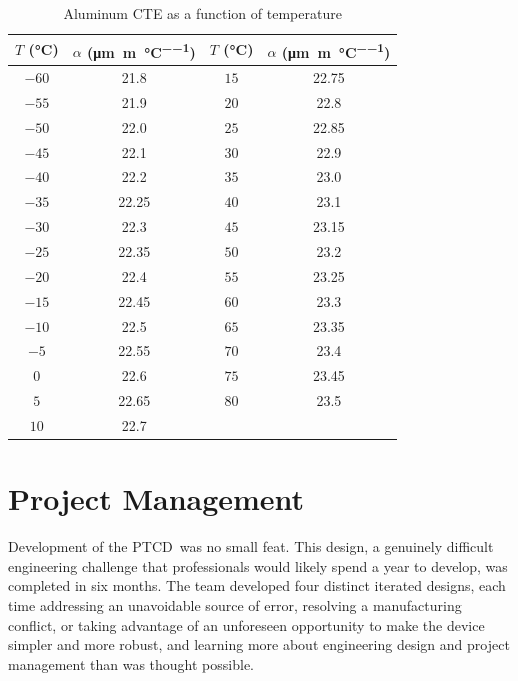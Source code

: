 \documentclass[12pt, letterpaper]{report}%
\newcommand{\device}{PTCD}
\begin{document}
\begin{appendices}
		\vspace{1em}
		\begin{table}[H]
			\centering
			\caption{Aluminum CTE as a function of temperature\cite{ref_NASA_specs_Al}}
			\label{tab:CTE_Al}
			\begin{tabular}{cc|cc}
				\toprule
				$T$ (\si{\degreeCelsius}) & $\alpha$ (\si{\micro\meter\per\meter\per\degreeCelsius}) &
				$T$ (\si{\degreeCelsius}) & $\alpha$ (\si{\micro\meter\per\meter\per\degreeCelsius}) \\
				\midrule
				$-60$ & 21.8  & $15$ & 22.75 \\
				$-55$ & 21.9  & $20$ & 22.8  \\
				$-50$ & 22.0  & $25$ & 22.85 \\
				$-45$ & 22.1  & $30$ & 22.9  \\
				$-40$ & 22.2  & $35$ & 23.0  \\
				$-35$ & 22.25 & $40$ & 23.1  \\
				$-30$ & 22.3  & $45$ & 23.15 \\
				$-25$ & 22.35 & $50$ & 23.2  \\
				$-20$ & 22.4  & $55$ & 23.25 \\
				$-15$ & 22.45 & $60$ & 23.3  \\
				$-10$ & 22.5  & $65$ & 23.35 \\
				$-5$  & 22.55 & $70$ & 23.4  \\
				$0$   & 22.6  & $75$ & 23.45 \\
				$5$   & 22.65 & $80$ & 23.5  \\
				$10$  & 22.7  &      &       \\
				\bottomrule
			\end{tabular}
		\end{table}

\chapter{Project Management}
\label{app:PM}

	

	Development of the \device\ was no small feat. This design, a genuinely difficult engineering challenge that professionals would likely spend a year to develop, was completed in six months.
	The team developed four distinct iterated designs, each time addressing an unavoidable source of error, resolving a manufacturing conflict, or taking advantage of an unforeseen opportunity to make the device simpler and more robust,
	and learning more about engineering design and project management than was thought possible.


\end{appendices}
\end{document}
